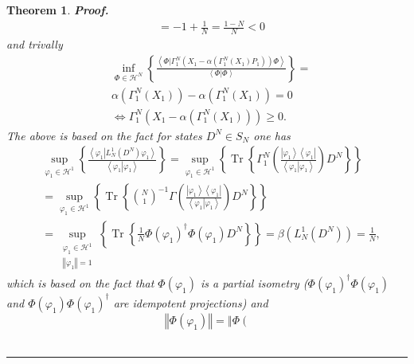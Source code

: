 \documentclass[aps,preprint]{revtex4}%
\newtheorem{theorem}{Theorem}
\newenvironment{proof}[1][Proof]{\noindent\textbf{#1.} }{\ \rule{0.5em}{0.5em}}
\begin{document}
\begin{theorem}
\begin{proof}
\begin{align}
&  =-1+\frac{1}{N}=\frac{1-N}{N}<0
\end{align}
and trivally
\begin{align}
&  \inf_{\Phi\in\mathcal{H}^{N}}\left\{  \frac{\left\langle \left.
\Phi\right\vert \Gamma_{1}^{N}\left(  X_{1}-\alpha\left(  \Gamma_{1}%
^{N}\left(  X_{1}\right)  P_{1}\right)  \right)  \Phi\right\rangle
}{\left\langle \left.  \Phi\right\vert \Phi\right\rangle }\right\}  =\\
&  \alpha\left(  \Gamma_{1}^{N}\left(  X_{1}\right)  \right)  -\alpha\left(
\Gamma_{1}^{N}\left(  X_{1}\right)  \right)  =0\\
&  \Leftrightarrow\Gamma_{1}^{N}\left(  X_{1}-\alpha\left(  \Gamma_{1}%
^{N}\left(  X_{1}\right)  \right)  \right)  \geq0.
\end{align}
The above is based on the fact for states $D^{N}\in S_{N}$ one has
\begin{align}
&  \sup_{\varphi_{1}\in\mathcal{H}^{1}}\left\{  \frac{\left\langle \left.
\varphi_{1}\right\vert L_{N}^{1}\left(  D^{N}\right)  \varphi_{1}\right\rangle
}{\left\langle \left.  \varphi_{1}\right\vert \varphi_{1}\right\rangle
}\right\}  =\sup_{\varphi_{1}\in\mathcal{H}^{1}}\left\{  \operatorname{Tr}%
\left\{  \Gamma_{1}^{N}\left(  \frac{\left\vert \varphi_{1}\right\rangle
\left\langle \varphi_{1}\right\vert }{\left\langle \left.  \varphi
_{1}\right\vert \varphi_{1}\right\rangle }\right)  D^{N}\right\}  \right\} \\
&  \left.  =\right.  \sup_{\varphi_{1}\in\mathcal{H}^{1}}\left\{
\operatorname{Tr}\left\{  \binom{N}{1}^{-1}\Gamma\left(  \frac{\left\vert
\varphi_{1}\right\rangle \left\langle \varphi_{1}\right\vert }{\left\langle
\left.  \varphi_{1}\right\vert \varphi_{1}\right\rangle }\right)
D^{N}\right\}  \right\} \\
&  \left.  =\right.  \sup_{\substack{\varphi_{1}\in\mathcal{H}^{1}\\\left\Vert
\varphi_{1}\right\Vert =1}}\left\{  \operatorname{Tr}\left\{  \frac{1}{N}%
\Phi\left(  \varphi_{1}\right)  ^{\dagger}\Phi\left(  \varphi_{1}\right)
D^{N}\right\}  \right\}  =\beta\left(  L_{N}^{1}\left(  D^{N}\right)  \right)
=\frac{1}{N},
\end{align}
which is based on the fact that $\Phi\left(  \varphi_{1}\right)  $ is a
partial isometry ($\Phi\left(  \varphi_{1}\right)  ^{\dagger}\Phi\left(
\varphi_{1}\right)  $ and $\Phi\left(  \varphi_{1}\right)  \Phi\left(
\varphi_{1}\right)  ^{\dagger}$ are idempotent projections) and
\begin{equation}
\left\Vert \Phi\left(  \varphi_{1}\right)  \right\Vert =\left\Vert \Phi\left(

\end{equation}
\end{proof}
\end{theorem}
\end{document}
